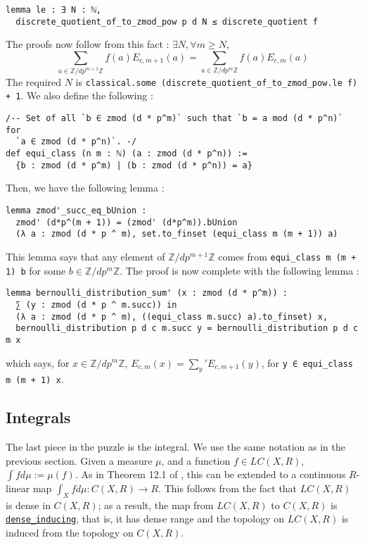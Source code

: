 \documentclass[a4paper,UKenglish,cleveref, autoref, thm-restate]{lipics-v2021}
\newcommand{\lean}[1]{\texttt{#1}\xspace} %
\begin{document}
\begin{lstlisting}
lemma le : ∃ N : ℕ, 
  discrete_quotient_of_to_zmod_pow p d N ≤ discrete_quotient f
\end{lstlisting} 
The proofs now follow from this fact : $\exists N, \forall m \ge N$,
$$ \sum_{a \in \mathbb{Z}/dp^{m + 1} \mathbb{Z}} f(a) E_{c,m + 1}(a) = \sum_{a \in \mathbb{Z}/dp^{m} \mathbb{Z}} f(a) E_{c,m}(a) $$
The required $N$ is \lean{classical.some (discrete\_quotient\_of\_to\_zmod\_pow.le f) + 1}. We also define the following : 
\begin{lstlisting}
/-- Set of all `b ∈ zmod (d * p^m)` such that `b = a mod (d * p^n)` for 
  `a ∈ zmod (d * p^n)`. -/
def equi_class (n m : ℕ) (a : zmod (d * p^n)) := 
  {b : zmod (d * p^m) | (b : zmod (d * p^n)) = a}
\end{lstlisting}
Then, we have the following lemma :
\begin{lstlisting}
lemma zmod'_succ_eq_bUnion : 
  zmod' (d*p^(m + 1)) = (zmod' (d*p^m)).bUnion
  (λ a : zmod (d * p ^ m), set.to_finset (equi_class m (m + 1)) a) 
\end{lstlisting}
This lemma says that any element of $\mathbb{Z}/dp^{m + 1} \mathbb{Z}$ comes from \lean{equi\_class m (m + 1) b} for some $b \in \mathbb{Z}/dp^m \mathbb{Z}$. 
The proof is now complete with the following lemma :
\begin{lstlisting}
lemma bernoulli_distribution_sum' (x : zmod (d * p^m)) : 
  ∑ (y : zmod (d * p ^ m.succ)) in 
  (λ a : zmod (d * p ^ m), ((equi_class m.succ) a).to_finset) x,
  bernoulli_distribution p d c m.succ y = bernoulli_distribution p d c m x 
\end{lstlisting}
which says, for $x \in \mathbb{Z}/dp^m \mathbb{Z}$, $E_{c, m} (x) = \sum_{y}' E_{c, m + 1} (y)$, for \lean{y ∈ equi\_class m (m + 1) x}. 

\subsection{Integrals}
The last piece in the puzzle is the integral. We use the same notation as in the previous
section. Given a measure $\mu$, and a function $f \in LC(X, R)$, $\int f d\mu := \mu(f)$. As in Theorem 12.1 of \cite{cyc}, this can be extended to a
continuous $R$-linear map $ \int_X f d\mu : C(X, R) \xrightarrow[]{} R $. 
This follows from the fact that $LC(X, R)$ is dense in $C(X, R)$; as a result, the map from 
$LC(X, R)$ to $C(X, R)$ is \href{https://leanprover-community.github.io/mathlib_docs/topology/dense_embedding.html#dense_inducing}{\lean{dense\_inducing}}, 
that is, it has dense range and the topology on $LC(X, R)$ is 
induced from the topology on $C(X,R)$. 
\end{document}

